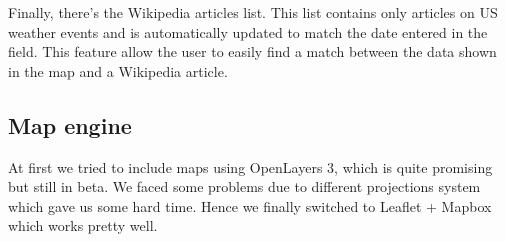 Finally, there's the Wikipedia articles list. This list contains only articles on US weather events and is automatically updated to match the date entered in the field. This feature allow the user to easily find a match between the data shown in the map and a Wikipedia article.

\subsection{Map engine}
At first we tried to include maps using OpenLayers 3, which is quite promising but still in beta. We faced some problems due to different projections system which gave us some hard time. Hence we finally switched to Leaflet + Mapbox which works pretty well.
